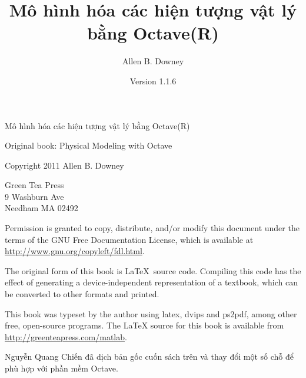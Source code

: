 \documentclass[12pt]{book}
\begin{document}
\frontmatter


\newcommand{\thetitle}{Mô hình hóa các hiện tượng vật lý bằng Octave(R)}
\newcommand{\theversion}{1.1.6}

\title {\thetitle}
\author {Allen B. Downey}
\date {Version \theversion}





\vspace{2in}

\begin{center}
{\Large \thetitle}

\vspace{0.25in}

Original book: Physical Modeling with Octave

Copyright 2011 Allen B. Downey
\end{center}

\vspace{0.25in}

\begin{flushleft}
Green Tea Press       \\
9 Washburn Ave \\
Needham MA 02492
\end{flushleft}

Permission is granted to copy, distribute, and/or modify this document
under the terms of the GNU Free Documentation License, which is available 
at \url{http://www.gnu.org/copyleft/fdl.html}.

The original form of this book is \LaTeX\ source code.  Compiling this
code has the effect of generating a device-independent representation
of a textbook, which can be converted to other formats and printed.

This book was typeset by the author using latex, dvips and ps2pdf,
among other free, open-source programs.
The LaTeX source for this book is available from
\url{http://greenteapress.com/matlab}.

Nguyễn Quang Chiến đã dịch bản gốc cuốn sách trên và thay đổi một số chỗ để 
phù hợp với phần mềm Octave.
\end{document}
